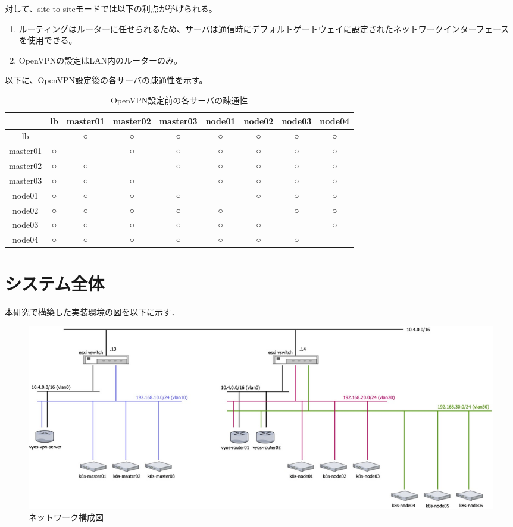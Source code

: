 対して、site-to-siteモードでは以下の利点が挙げられる。

\begin{enumerate}
  \item ルーティングはルーターに任せられるため、サーバは通信時にデフォルトゲートウェイに設定されたネットワークインターフェースを使用できる。
  \item OpenVPNの設定はLAN内のルーターのみ。
\end{enumerate}

以下に、OpenVPN設定後の各サーバの疎通性を示す。

\begin{table}[htb]
  \begin{center}
    \caption{OpenVPN設定前の各サーバの疎通性}
    \begin{tabular}{|c|c|c|c|c|c|c|c|c|} \hline
      & lb & master01 & master02 & master03 & node01 & node02 & node03 & node04 \\ \hline
      lb & \ & ○ & ○ & ○ & ○ & ○ & ○ & ○ \\ \hline
      master01 & ○ & \ & ○ & ○ & ○ & ○ & ○ & ○ \\ \hline
      master02 & ○ & ○ & \ & ○ & ○ & ○ & ○ & ○ \\ \hline
      master03 & ○ & ○ & ○ & \ & ○ & ○ & ○ & ○ \\ \hline
      node01 & ○ & ○ & ○ & ○ & \ & ○ & ○ & ○ \\ \hline
      node02 & ○ & ○ & ○ & ○ & ○ & \ & ○ & ○ \\ \hline
      node03 & ○ & ○ & ○ & ○ & ○ & ○ & \ & ○ \\ \hline
      node04 & ○ & ○ & ○ & ○ & ○ & ○ & ○ & \ \\ \hline
    \end{tabular}
  \end{center}
\end{table}

\section{システム全体}
\label{implementation:system}
本研究で構築した実装環境の図を以下に示す．

\begin{figure}[htbp]
  \begin{center}
    \includegraphics[width=\textwidth]{./figures/network-diagram.jpg}
    \caption{ネットワーク構成図}
  \end{center}
\end{figure}

